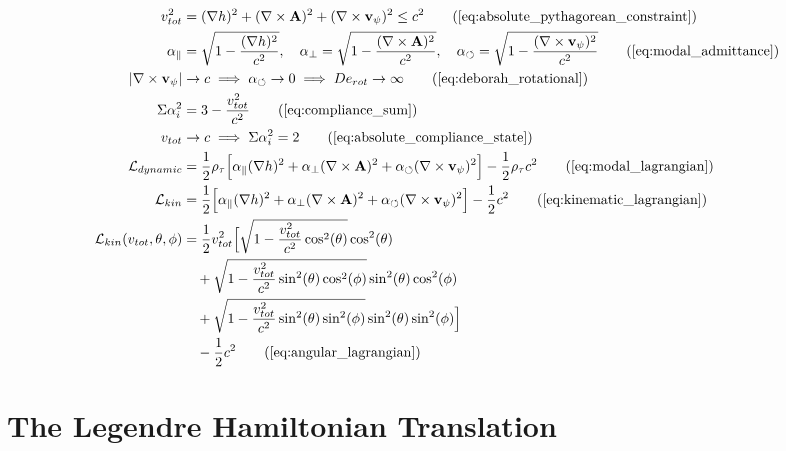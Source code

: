 \documentclass[11pt, a4paper]{article}
\begin{document}
\begin{tcolorbox}[recallbox, title={\ref{box:unified_lagrangian}. The Unified Fluid Lagrangian \& Modal Admittance}]
\begin{align}
    v_{tot}^2 &= (\nabla h)^2 + (\nabla \times \mathbf{A})^2 + (\nabla \times \mathbf{v}_{\psi})^2 \le c^2 \tag{\ref{eq:absolute_pythagorean_constraint}} \\
    \alpha_{\parallel} &= \sqrt{1 - \frac{(\nabla h)^2}{c^2}}, \quad \alpha_{\perp} = \sqrt{1 - \frac{(\nabla \times \mathbf{A})^2}{c^2}}, \quad \alpha_{\circlearrowleft} = \sqrt{1 - \frac{(\nabla \times \mathbf{v}_{\psi})^2}{c^2}} \tag{\ref{eq:modal_admittance}} \\
    |\nabla \times \mathbf{v}_{\psi}| &\to c \implies \alpha_{\circlearrowleft} \to 0 \implies De_{rot} \to \infty \tag{\ref{eq:deborah_rotational}} \\
    \Sigma \alpha_i^2 &= 3 - \frac{v_{tot}^2}{c^2} \tag{\ref{eq:compliance_sum}} \\
    v_{tot} &\to c \implies \Sigma \alpha_i^2 = 2 \tag{\ref{eq:absolute_compliance_state}} \\
    \mathcal{L}_{dynamic} &= \frac{1}{2} \rho_{\tau} \Big[ \alpha_{\parallel}(\nabla h)^2 + \alpha_{\perp}(\nabla \times \mathbf{A})^2 + \alpha_{\circlearrowleft}(\nabla \times \mathbf{v}_{\psi})^2 \Big] - \frac{1}{2} \rho_{\tau} c^2 \tag{\ref{eq:modal_lagrangian}} \\
    \mathcal{L}_{kin} &= \frac{1}{2} \Big[ \alpha_{\parallel}(\nabla h)^2 + \alpha_{\perp}(\nabla \times \mathbf{A})^2 + \alpha_{\circlearrowleft}(\nabla \times \mathbf{v}_{\psi})^2 \Big] - \frac{1}{2} c^2 \tag{\ref{eq:kinematic_lagrangian}} \\
    \mathcal{L}_{kin}(v_{tot}, \theta, \phi) &= \frac{1}{2} v_{tot}^2 \Big[ \sqrt{1 - \frac{v_{tot}^2}{c^2} \cos^2(\theta)} \cos^2(\theta) \nonumber \\
    &\quad + \sqrt{1 - \frac{v_{tot}^2}{c^2} \sin^2(\theta)\cos^2(\phi)} \sin^2(\theta)\cos^2(\phi) \nonumber \\
    &\quad + \sqrt{1 - \frac{v_{tot}^2}{c^2} \sin^2(\theta)\sin^2(\phi)} \sin^2(\theta)\sin^2(\phi) \Big] \nonumber \\
    &\quad - \frac{1}{2} c^2 \tag{\ref{eq:angular_lagrangian}}
\end{align}
\end{tcolorbox}
\section{The Legendre Hamiltonian Translation}
\label{sec:deriv_legendre_hamiltonian}
\end{document}
